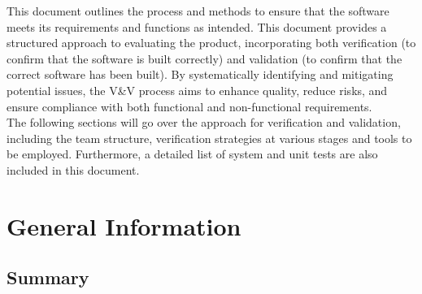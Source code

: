 \documentclass[12pt, titlepage]{article}
\begin{document}
\newpage

\tableofcontents

\listoftables
{}


\newpage







This document outlines the process and methods to ensure that the
software meets its requirements and functions as intended. This
document provides a structured approach to evaluating the product,
incorporating both verification (to confirm that the software is
built correctly) and validation (to confirm that the correct software
has been built). By systematically identifying and mitigating
potential issues, the V\&V process aims to enhance quality, reduce
risks, and ensure compliance with both functional and non-functional
requirements.\\

The following sections will go over the approach for verification and
validation, including the team structure, verification strategies at
various stages and tools to be employed. Furthermore, a detailed list
of system and unit tests are also included in this document.

\section{General Information}

\subsection{Summary}
\end{document}
